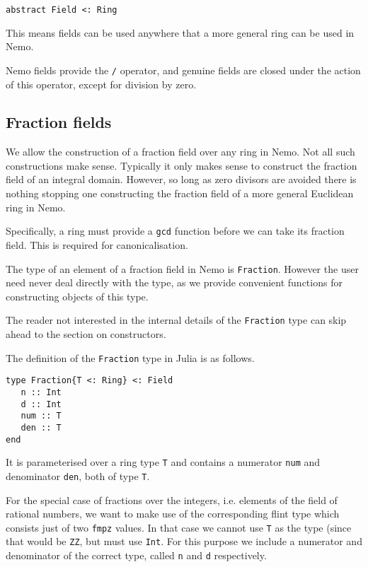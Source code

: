 \documentclass[a4paper,10pt]{article}
\newcommand{\code}{\lstinline}
\begin{document}
{{{\begin{lstlisting}
abstract Field <: Ring
\end{lstlisting}

This means fields can be used anywhere that a more general ring can be used
in Nemo.

Nemo fields provide the \code{/} operator, and genuine fields are closed under
the action of this operator, except for division by zero.

\subsection{Fraction fields}

We allow the construction of a fraction field over any ring in Nemo. Not all
such constructions make sense. Typically it only makes sense to construct the
fraction field of an integral domain. However, so long as zero divisors are
avoided there is nothing stopping one constructing the fraction field of a
more general Euclidean ring in Nemo.

Specifically, a ring must provide a \code{gcd} function before we can take its
fraction field. This is required for canonicalisation.

The type of an element of a fraction field in Nemo is \code{Fraction}. However
the user need never deal directly with the type, as we provide convenient
functions for constructing objects of this type.

The reader not interested in the internal details of the \code{Fraction} type
can skip ahead to the section on constructors.

The definition of the \code{Fraction} type in Julia is as follows.

\begin{lstlisting}
type Fraction{T <: Ring} <: Field
   n :: Int
   d :: Int
   num :: T
   den :: T
end
\end{lstlisting}

It is parameterised over a ring type \code{T} and contains a numerator 
\code{num} and denominator \code{den}, both of type \code{T}.

For the special case of fractions over the integers, i.e. elements of the
field of rational numbers, we want to make use of the corresponding flint
type which consists just of two \code{fmpz} values. In that case we cannot
use \code{T} as the type (since that would be \code{ZZ}, but must use
\code{Int}. For this purpose we include a numerator and denominator of the
correct type, called \code{n} and \code{d} respectively.

}}}
\end{document}
